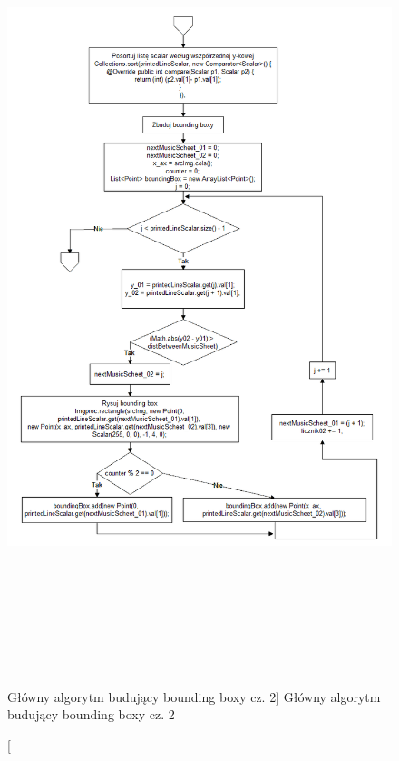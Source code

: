 \documentclass[a4paper,12pt]{article}
\begin{document}
	        \begin{figure}[!ht]  
			    \begin{center}
				    \includegraphics[height=23cm] {image//algorithm//majorProcesing_02.png} 
			    \end{center}
			    \caption
    			    [Główny algorytm budujący bounding boxy cz. 2]  
    			    {Główny algorytm budujący bounding boxy cz. 2}  
    			    \label{fig:boundingBox02}
		    \end{figure} 
		
\end{document}
